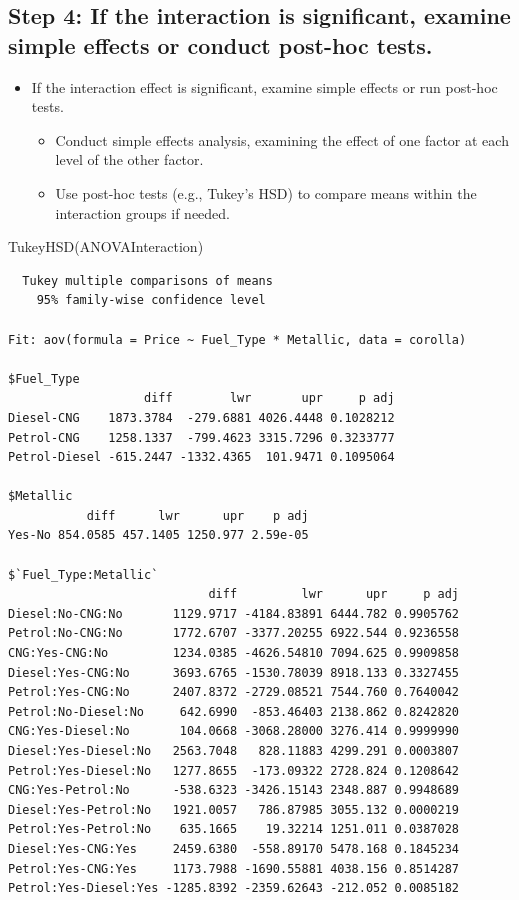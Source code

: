 \documentclass[
  letterpaper,
  DIV=11,
  numbers=noendperiod]{scrreprt}
\newenvironment{Shaded}{\begin{snugshade}}{\end{snugshade}}
\newcommand{\FunctionTok}[1]{\textcolor[rgb]{0.28,0.35,0.67}{#1}}
\newcommand{\NormalTok}[1]{\textcolor[rgb]{0.00,0.23,0.31}{#1}}
\providecommand{\tightlist}{%
  \setlength{\itemsep}{0pt}\setlength{\parskip}{0pt}}\usepackage{longtable,booktabs,array}
\begin{document}
\subsection{Step 4: If the interaction is significant, examine simple
effects or conduct post-hoc
tests.}\label{step-4-if-the-interaction-is-significant-examine-simple-effects-or-conduct-post-hoc-tests.}

\begin{itemize}
\tightlist
\item
  If the interaction effect is significant, examine simple effects or
  run post-hoc tests.

  \begin{itemize}
  \tightlist
  \item
    Conduct simple effects analysis, examining the effect of one factor
    at each level of the other factor.
  \item
    Use post-hoc tests (e.g., Tukey's HSD) to compare means within the
    interaction groups if needed.
  \end{itemize}
\end{itemize}

\begin{Shaded}
\begin{Highlighting}[]
\FunctionTok{TukeyHSD}\NormalTok{(ANOVAInteraction)}
\end{Highlighting}
\end{Shaded}

\begin{verbatim}
  Tukey multiple comparisons of means
    95% family-wise confidence level

Fit: aov(formula = Price ~ Fuel_Type * Metallic, data = corolla)

$Fuel_Type
                   diff        lwr       upr     p adj
Diesel-CNG    1873.3784  -279.6881 4026.4448 0.1028212
Petrol-CNG    1258.1337  -799.4623 3315.7296 0.3233777
Petrol-Diesel -615.2447 -1332.4365  101.9471 0.1095064

$Metallic
           diff      lwr      upr    p adj
Yes-No 854.0585 457.1405 1250.977 2.59e-05

$`Fuel_Type:Metallic`
                            diff         lwr      upr     p adj
Diesel:No-CNG:No       1129.9717 -4184.83891 6444.782 0.9905762
Petrol:No-CNG:No       1772.6707 -3377.20255 6922.544 0.9236558
CNG:Yes-CNG:No         1234.0385 -4626.54810 7094.625 0.9909858
Diesel:Yes-CNG:No      3693.6765 -1530.78039 8918.133 0.3327455
Petrol:Yes-CNG:No      2407.8372 -2729.08521 7544.760 0.7640042
Petrol:No-Diesel:No     642.6990  -853.46403 2138.862 0.8242820
CNG:Yes-Diesel:No       104.0668 -3068.28000 3276.414 0.9999990
Diesel:Yes-Diesel:No   2563.7048   828.11883 4299.291 0.0003807
Petrol:Yes-Diesel:No   1277.8655  -173.09322 2728.824 0.1208642
CNG:Yes-Petrol:No      -538.6323 -3426.15143 2348.887 0.9948689
Diesel:Yes-Petrol:No   1921.0057   786.87985 3055.132 0.0000219
Petrol:Yes-Petrol:No    635.1665    19.32214 1251.011 0.0387028
Diesel:Yes-CNG:Yes     2459.6380  -558.89170 5478.168 0.1845234
Petrol:Yes-CNG:Yes     1173.7988 -1690.55881 4038.156 0.8514287
Petrol:Yes-Diesel:Yes -1285.8392 -2359.62643 -212.052 0.0085182
\end{verbatim}
\end{document}
